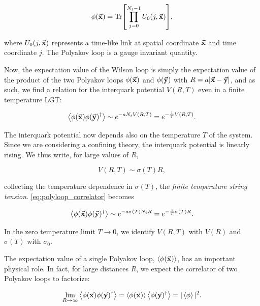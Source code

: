 \documentclass[reqno,12pt]{article}
\numberwithin{equation}{section}
\begin{document}
\begin{equation} \label{eq:polyloop_definition}
	\phi(\va{x}) = \Tr[\prod_{j = 0}^{N_t - 1} U_0(j, \va{x})],
\end{equation}

where $U_0(j, \va{x})$ represents a time-like link at spatial coordinate $\va{x}$ and time coordinate $j$. The Polyakov
loop is a gauge invariant quantity.

Now, the expectation value of the Wilson loop is simply the expectation value of the product of the two Polyakov loops
$\phi(\va{x})$ and $\phi(\va{y})$ with $R = a |\va{x} - \va{y}|$, and as such, we find a relation for the interquark potential
$V(R, T)$ even in a finite temperature LGT:

\begin{equation} \label{eq:polyloop_correlator}
	\expval{\phi(\va{x}) \phi(\va{y})^\dagger} \sim e^{-aN_t V(R, T)} = e^{-\frac{1}{T} V(R, T)}.
\end{equation}

The interquark potential now depends also on the temperature $T$ of the system. Since we are considering a confining theory,
the interquark potential is linearly rising. We thus write, for large values of $R$,

\begin{equation}
	V(R, T) \sim \sigma(T) R,
\end{equation}

collecting the temperature dependence in $\sigma(T)$, the \textit{finite temperature string tension}. 
\eqref{eq:polyloop_correlator} becomes

\begin{equation}
	\expval{\phi(\va{x}) \phi(\va{y})^\dagger} \sim e^{-a\sigma(T)N_t R} = e^{-\frac{1}{T}\sigma(T) R}. 
\end{equation}

In the zero temperature limit $T \rightarrow 0$, we identify $V(R, T)$ with $V(R)$ and $\sigma(T)$ with $\sigma_0$.

The expectation value of a single Polyakov loop, $\expval{\phi(\va{x})}$, has an important physical role. In fact,
for large distances $R$, we expect the correlator of two Polyakov loops to factorize:

\begin{equation}
	\lim_{R \rightarrow \infty} \expval{\phi(\va{x})\phi(\va{y})^\dagger} = 
	\expval{\phi(\va{x})}\expval{\phi(\va{y})^\dagger} = |\expval{\phi}|^2.
\end{equation}
\end{document}
